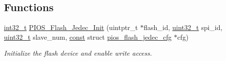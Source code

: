 \subsection*{Functions}
\begin{DoxyCompactItemize}
\item 
\hyperlink{group___n_a_m_e_gafd12020da5a235dfcf0c3c748fb5baed}{int32\-\_\-t} \hyperlink{group___p_i_o_s___f_l_a_s_h_ga9a23c23702dd0004514c87ce4a5520dc}{P\-I\-O\-S\-\_\-\-Flash\-\_\-\-Jedec\-\_\-\-Init} (uintptr\-\_\-t $\ast$flash\-\_\-id, \hyperlink{stdint_8h_a435d1572bf3f880d55459d9805097f62}{uint32\-\_\-t} spi\-\_\-id, \hyperlink{stdint_8h_a435d1572bf3f880d55459d9805097f62}{uint32\-\_\-t} slave\-\_\-num, \hyperlink{group___n_a_m_e_ga7ae6d0e43244213b34de2c2b9aa30da6}{const} struct \hyperlink{structpios__flash__jedec__cfg}{pios\-\_\-flash\-\_\-jedec\-\_\-cfg} $\ast$cfg)
\begin{DoxyCompactList}\small\item\em Initialize the flash device and enable write access. \end{DoxyCompactList}\end{DoxyCompactItemize}
